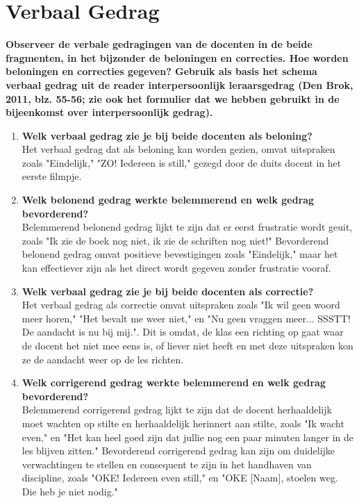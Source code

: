 \documentclass{article}
\begin{document}
    \section{Verbaal Gedrag}
        \textbf{Observeer de verbale gedragingen van de docenten in de beide 
        fragmenten, in het bijzonder de beloningen en correcties. Hoe worden 
        beloningen en correcties gegeven? Gebruik als basis het schema verbaal 
        gedrag uit de reader interpersoonlijk leraarsgedrag (Den Brok, 2011, blz. 
        55-56; zie ook het formulier dat we hebben gebruikt in de bijeenkomst over 
        interpersoonlijk gedrag).}
        \begin{enumerate}[label=(\alph*)]
            \item \textbf{Welk verbaal gedrag zie je bij beide docenten als beloning?} \\
                Het verbaal gedrag dat als beloning kan worden gezien, omvat 
                uitspraken zoals "Eindelijk," "ZO! Iedereen is still," gezegd door
                de duits docent in het eerste filmpje.
            \item \textbf{Welk belonend gedrag werkte belemmerend en welk gedrag bevorderend?} \\
                Belemmerend belonend gedrag lijkt te zijn dat er eerst frustratie 
                wordt geuit, zoals "Ik zie de boek nog niet, ik zie de schriften nog
                niet!" Bevorderend belonend gedrag omvat positieve bevestigingen 
                zoals "Eindelijk," maar het kan effectiever zijn als het direct 
                wordt gegeven zonder frustratie vooraf.
            \item \textbf{Welk verbaal gedrag zie je bij beide docenten als correctie?} \\
                Het verbaal gedrag als correctie omvat uitspraken zoals "Ik wil geen
                woord meer horen," "Het bevalt me weer niet," en "Nu geen vraggen 
                meer... SSSTT! De aandacht is nu bij mij.". Dit is omdat, de klas 
                een richting op gaat waar de docent het niet mee eens is, of liever
                niet heeft en met deze uitspraken kon ze de aandacht weer op de les
                richten.
            \item \textbf{Welk corrigerend gedrag werkte belemmerend en welk gedrag bevorderend?} \\
                Belemmerend corrigerend gedrag lijkt te zijn dat de docent 
                herhaaldelijk moet wachten op stilte en herhaaldelijk herinnert aan 
                stilte, zoals "Ik wacht even," en "Het kan heel goed zijn dat jullie
                nog een paar minuten langer in de les blijven zitten." Bevorderend 
                corrigerend gedrag kan zijn om duidelijke verwachtingen te stellen 
                en consequent te zijn in het handhaven van discipline, zoals "OKE! 
                Iedereen even still," en "OKE [Naam], stoelen weg. Die heb je niet 
                nodig."
        \end{enumerate}
    \newpage
    
\end{document}
